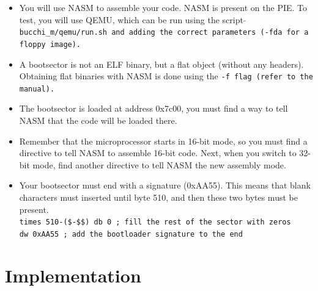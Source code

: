 \begin{itemize}
\item
  You will use NASM to assemble your code. NASM is present on the
  PIE. To test, you will use QEMU, which can be run using the script
  \tt $\tilde{}$bucchi\_m/qemu/run.sh \rm and adding the correct parameters
  (\tt -fda \rm for a floppy image).
\item
  A bootsector is not an ELF binary, but a flat object (without any
  headers). Obtaining flat binaries with NASM is done using the \tt -f \rm
  flag (refer to the manual).
\item
  The bootsector is loaded at address 0x7c00, you must find a way to
  tell NASM that the code will be loaded there.
\item
  Remember that the microprocessor starts in 16-bit mode, so you must
  find a directive to tell NASM to assemble 16-bit code. Next, when
  you switch to 32-bit mode, find another directive to tell NASM the
  new assembly mode.
\item
  Your bootsector must end with a signature (0xAA55). This means that
  blank characters must inserted until byte 510, and then these two
  bytes must be present.\\
  \tt times 510-(\$-\$\$) db 0	; fill the rest of the sector with zeros\\
  \tt dw 0xAA55			; add the bootloader signature to the end
\end{itemize}

\newpage

\section*{Implementation}

